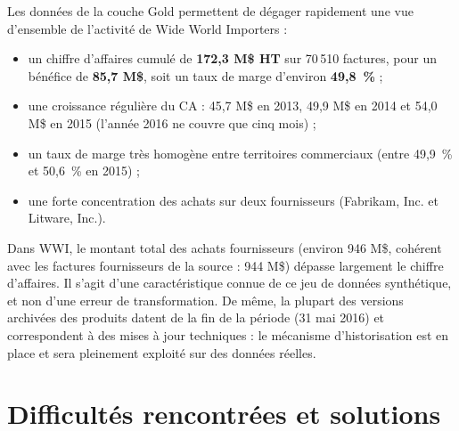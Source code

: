 Les données de la couche Gold permettent de dégager rapidement une vue d'ensemble de l'activité de
Wide World Importers :
\begin{itemize}
  \item un chiffre d'affaires cumulé de \textbf{172,3 M\$ HT} sur 70\,510 factures, pour un bénéfice de
        \textbf{85,7 M\$}, soit un taux de marge d'environ \textbf{49,8~\%} ;
  \item une croissance régulière du CA : 45,7 M\$ en 2013, 49,9 M\$ en 2014 et 54,0 M\$ en 2015
        (l'année 2016 ne couvre que cinq mois) ;
  \item un taux de marge très homogène entre territoires commerciaux (entre 49,9~\% et 50,6~\% en 2015) ;
  \item une forte concentration des achats sur deux fournisseurs (Fabrikam, Inc. et Litware, Inc.).
\end{itemize}

\begin{infobox}[title=Remarque sur les données]
Dans WWI, le montant total des achats fournisseurs (environ 946 M\$, cohérent avec les factures
fournisseurs de la source : 944 M\$) dépasse largement le chiffre d'affaires. Il s'agit d'une
caractéristique connue de ce jeu de données synthétique, et non d'une erreur de transformation. De même,
la plupart des versions archivées des produits datent de la fin de la période (31 mai 2016) et
correspondent à des mises à jour techniques : le mécanisme d'historisation est en place et sera
pleinement exploité sur des données réelles.
\end{infobox}

\section{Difficultés rencontrées et solutions}

